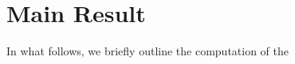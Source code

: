 \documentclass[10pt]{article}
\newcommand{\+}{%
	\raisebox{0.18ex}{\scaleobj{0.55}{+}}
}
\newtheorem{definition}{Definition}
\begin{document}




\section{Main Result}
In what follows, we briefly outline the computation of the 

\end{document}
